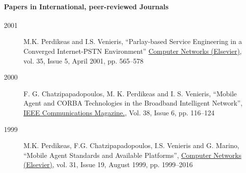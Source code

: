 \documentclass[10pt,a4paper]{article} %
\begin{document}
  
  \paragraph{Papers in International, peer-reviewed Journals}
  \begin{description}
  \item[2001] M.K. Perdikeas and I.S. Venieris,  ``Parlay-based Service Engineering in a Converged Internet-PSTN Environment'' \href{http://www.sciencedirect.com/science/journal/13891286}{Computer Networks (Elsevier)},
    vol. 35, Issue 5, April 2001, pp. 565--578
  \item[2000]F. G. Chatzipapadopoulos, M. K. Perdikeas and I. S. Venieris, ``Mobile Agent and CORBA Technologies in the Broadband Intelligent Network'', \href{http://www.comsoc.org/commag}{IEEE Communications Magazine.}, Vol. 38, Issue 6, pp. 116--124
    \item[1999] M.K. Perdikeas, F.G. Chatzipapadopoulos, I.S. Venieris and G. Marino, ``Mobile Agent Standards and Available Platforms'', \href{http://www.sciencedirect.com/science/journal/13891286}{Computer Networks (Elsevier)}, vol. 31, Issue 19, August 1999, pp. 1999--2016
  \end{description}
\end{document}
